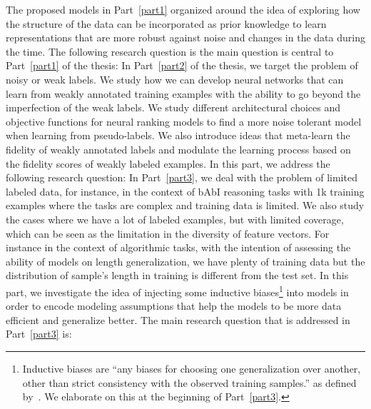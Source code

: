 The proposed models in Part~\ref{part1} organized around the idea of exploring how the structure of the data can be incorporated as prior knowledge to learn representations that are more robust against noise and changes in the data during the time. 
The following research question is the main question is central to Part~\ref{part1} of the thesis:
%
In Part~\ref{part2} of the thesis, we target the problem of noisy or weak labels. We study how we can develop neural networks that can learn from weakly annotated training examples with the ability to go beyond the imperfection of the weak labels. We study different architectural choices and objective functions for neural ranking models to find a more noise tolerant model when learning from pseudo-labels.  We also introduce ideas that meta-learn the fidelity of weakly annotated labels and modulate the learning process based on the fidelity scores of weakly labeled examples.
In this part, we address the following research question:
%
In Part~\ref{part3}, we deal with the problem of limited labeled data, for instance, in the context of bAbI reasoning tasks with 1k training examples where the tasks are complex and training data is limited. We also study the cases where we have a lot of labeled examples, but with limited coverage, which can be seen as the limitation in the diversity of feature vectors. For instance in the context of algorithmic tasks, with the intention of assessing the ability of models on length generalization, we have plenty of training data but the distribution of sample's length in training is different from the test set. 
In this part, we investigate the idea of injecting some inductive biases\footnote{Inductive biases are ``any biases for choosing one generalization over another, other than strict consistency with the observed training samples.'' as defined by~\citet{Mitchell80theneed}. We elaborate on this at the beginning of Part~\ref{part3}.} into models in order to encode modeling assumptions that help the models to be more data efficient and generalize better.
The main research question that is addressed in Part~\ref{part3} is:


